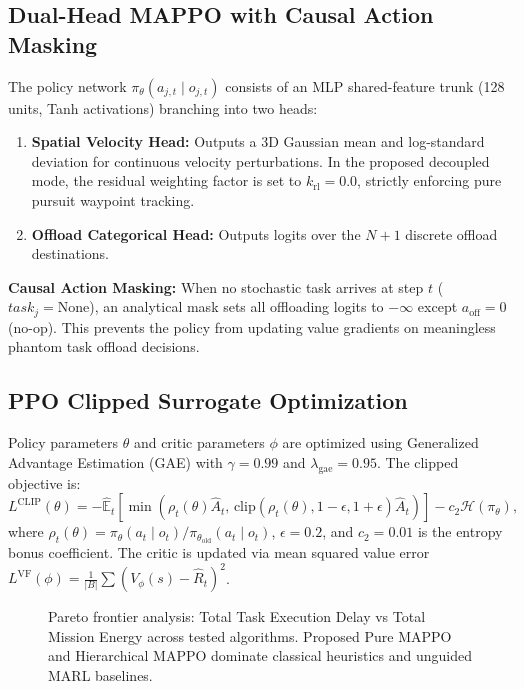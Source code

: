 \documentclass[conference]{IEEEtran}
\begin{document}
\subsection{Dual-Head MAPPO with Causal Action Masking}
The policy network $\pi_\theta(a_{j, t} \mid o_{j, t})$ consists of an MLP shared-feature trunk (128 units, Tanh activations) branching into two heads:
\begin{enumerate}
    \item \textbf{Spatial Velocity Head:} Outputs a 3D Gaussian mean and log-standard deviation for continuous velocity perturbations. In the proposed decoupled mode, the residual weighting factor is set to $k_{\text{rl}} = 0.0$, strictly enforcing pure pursuit waypoint tracking.
    \item \textbf{Offload Categorical Head:} Outputs logits over the $N+1$ discrete offload destinations.
\end{enumerate}

\textbf{Causal Action Masking:} When no stochastic task arrives at step $t$ ($task_j = \text{None}$), an analytical mask sets all offloading logits to $-\infty$ except $a_{\text{off}} = 0$ (no-op). This prevents the policy from updating value gradients on meaningless phantom task offload decisions.

\subsection{PPO Clipped Surrogate Optimization}
Policy parameters $\theta$ and critic parameters $\phi$ are optimized using Generalized Advantage Estimation (GAE) with $\gamma = 0.99$ and $\lambda_{\text{gae}} = 0.95$. The clipped objective is:
\begin{equation}
L^{\text{CLIP}}(\theta) = -\hat{\mathbb{E}}_t \left[ \min\left( \rho_t(\theta) \hat{A}_t, \, \text{clip}(\rho_t(\theta), 1 - \epsilon, 1 + \epsilon) \hat{A}_t \right) \right] - c_2 \mathcal{H}(\pi_\theta),
\end{equation}
where $\rho_t(\theta) = \pi_\theta(a_t \mid o_t) / \pi_{\theta_{\text{old}}}(a_t \mid o_t)$, $\epsilon = 0.2$, and $c_2 = 0.01$ is the entropy bonus coefficient. The critic is updated via mean squared value error $L^{\text{VF}}(\phi) = \frac{1}{|B|} \sum (V_\phi(s) - \hat{R}_t)^2$.

\begin{figure}[!t]
\centering
\caption{Pareto frontier analysis: Total Task Execution Delay vs Total Mission Energy across tested algorithms. Proposed Pure MAPPO and Hierarchical MAPPO dominate classical heuristics and unguided MARL baselines.}
\label{fig:pareto}
\end{figure}
\end{document}
